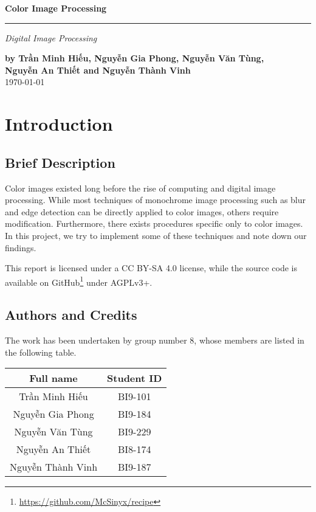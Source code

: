\documentclass[a4paper,12pt]{article}
\begin{document}
\setcounter{page}{0}
\thispagestyle{empty}
\begin{flushright}
  \setlength{\baselineskip}{1.4\baselineskip}
\textbf{\Huge Color Image Processing}
  \noindent\rule{\textwidth}{5pt}
  \emph{\Large Digital Image Processing}

  \textbf{by Trần Minh Hiếu, Nguyễn Gia Phong, Nguyễn Văn Tùng,\\
          Nguyễn An Thiết and Nguyễn Thành Vinh\\}
  \today
\end{flushright}
\pagebreak

\tableofcontents
\pagebreak

\section{Introduction}
\subsection{Brief Description}
Color images existed long before the rise of computing and digital image
processing.  While most techniques of monochrome image processing such as
blur and edge detection can be directly applied to color images, others
require modification.  Furthermore, there exists procedures specific only
to color images.  In this project, we try to implement some of these
techniques and note down our findings.

This report is licensed under a CC BY-SA 4.0 license, while the source code
is available on GitHub\footnote{\url{https://github.com/McSinyx/recipe}}
under AGPLv3+.

\subsection{Authors and Credits}
The work has been undertaken by group number 8, whose members are listed
in the following table.
\begin{center}
  \begin{tabular}{c c}
    \toprule
    Full name & Student ID\\
    \midrule
    Trần Minh Hiếu & BI9-101\\
    Nguyễn Gia Phong & BI9-184\\
    Nguyễn Văn Tùng & BI9-229\\
    Nguyễn An Thiết & BI8-174\\
    Nguyễn Thành Vinh & BI9-187\\
    \bottomrule
  \end{tabular}
\end{center}
\end{document}

